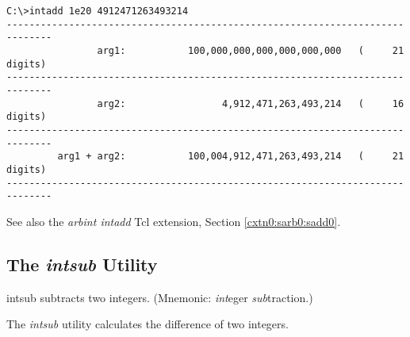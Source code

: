 \begin{dosutilcommandsampleinvocations}
\begin{scriptsize}
\begin{verbatim}
C:\>intadd 1e20 4912471263493214
------------------------------------------------------------------------------
                arg1:           100,000,000,000,000,000,000   (     21 digits)
------------------------------------------------------------------------------
                arg2:                 4,912,471,263,493,214   (     16 digits)
------------------------------------------------------------------------------
         arg1 + arg2:           100,004,912,471,263,493,214   (     21 digits)
------------------------------------------------------------------------------
\end{verbatim}
\end{scriptsize}
\end{dosutilcommandsampleinvocations}

\begin{dosutilcommandseealso}
See also the \emph{arbint intadd} Tcl extension, 
Section \cxtnzeroxrefhyphen{}\ref{cxtn0:sarb0:sadd0}.
\end{dosutilcommandseealso}


\subsection{The \emph{intsub} Utility}
\label{cdcm0:sali0:ssub0}

\begin{dosutilcommandname}{intsub}%
subtracts two integers.  (Mnemonic:  \emph{int}eger
\emph{sub}traction.)
\end{dosutilcommandname}

\begin{dosutilcommandsynopsis}
\end{dosutilcommandsynopsis}

\begin{dosutilcommanddescription}
The \emph{intsub} utility calculates the difference of two integers.
\end{dosutilcommanddescription}

